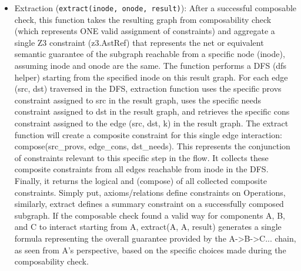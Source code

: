 \begin{itemize}
  \item Extraction (\texttt{extract(inode, onode, result)}):
    After a successful composable
    check, this function takes the resulting graph from
    composability check (which
    represents ONE valid assignment of constraints) and aggregate
    a single Z3
    constraint (z3.AstRef) that represents the net or equivalent
    semantic guarantee
    of the subgraph reachable from a specific node (inode),
    assuming inode and onode
    are the same. The function performs a DFS (dfs helper) starting from the
    specified inode on this result graph. For each edge (src,
    dst) traversed in the
    DFS, extraction function uses the specific provs constraint
    assigned to src in
    the result graph, uses the specific needs constraint assigned
    to dst in the
    result graph, and retrieves the specific cons constraint
    assigned to the edge
    (src, dst, k) in the result graph. The extract function will
    create a composite
    constraint for this single edge interaction:
    compose(src\_provs, edge\_cons,
    dst\_needs). This represents the conjunction of constraints
    relevant to this
    specific step in the flow. It collects these composite
    constraints from all
    edges reachable from inode in the DFS. Finally, it returns
    the logical and
    (compose) of all collected composite constraints. Simply put,
    axioms/relations
    define constraints on Operations, similarly, extract defines a summary
    constraint on a successfully composed subgraph. If the
    composable check found a
    valid way for components A, B, and C to interact starting
    from A, extract(A, A,
    result) generates a single formula representing the overall
    guarantee provided
    by the A->B->C... chain, as seen from A's perspective, based
    on the specific
    choices made during the composability check.
\end{itemize}
